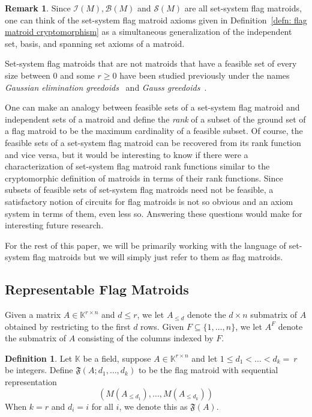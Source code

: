 \documentclass[12pt]{article}
\theoremstyle{definition}
\newtheorem{defn}[thm]{Definition}
\newtheorem{remark}[thm]{Remark}
\begin{document}
\begin{remark}\label{remark: flag matroid axioms genearlize matroid axioms}
    Since $\mathcal{I}(M), \mathcal{B}(M)$ and $\mathcal{S}(M)$ are all set-system flag matroids,
    one can think of the set-system flag matroid axioms given in Definition~\ref{defn: flag matroid cryptomorphism} as a simultaneous generalization of the independent set, basis, and spanning set axioms of a matroid.    
\end{remark}


Set-system flag matroids that are not matroids that have a feasible set of every size between $0$ and some $r \ge 0$ have been studied
previously under the names \emph{Gaussian elimination greedoids}~\cite{grinberga2020bhargava,grinberg2021greedoid} and \emph{Gauss greedoids}~\cite{greedoids}.

One can make an analogy between feasible sets of a set-system flag matroid and independent sets of a matroid and define the \emph{rank} of a subset of the ground set of a flag matroid to be the maximum cardinality of a feasible subset.
Of course, the feasible sets of a set-system flag matroid can be recovered from its rank function and vice versa,
but it would be interesting to know if there were a characterization of set-system flag matroid rank functions similar to the cryptomorphic definition of matroids in terms of their rank functions.
Since subsets of feasible sets of set-system flag matroids need not be feasible,
a satisfactory notion of circuits for flag matroids is not so obvious
and an axiom system in terms of them, even less so.
Answering these questions would make for interesting future research.

For the rest of this paper, we will be primarily working with the language of set-system flag matroids but we will simply just refer to them as flag matroids.

\subsection{Representable Flag Matroids}

Given a matrix $A \in \mathbb{K}^{r\times n}$
and $d \le r$, we let $A_{\le d}$ denote the $d\times n$ submatrix of $A$ obtained by restricting to the first $d$ rows.
Given $F \subseteq \{1,\dots,n\}$, we let $A^F$ denote the submatrix of $A$ consisting of the columns indexed by $F$.

\begin{defn}\label{defn: flag matroid from matrix}
    Let $\mathbb{K}$ be a field, suppose $A \in \mathbb{K}^{r\times n}$ and let $1 \le d_1 < \dots < d_k =~r$ be integers.
    Define $\mathfrak{F}(A; d_1, \dots, d_k)$ to be the flag matroid with sequential representation
    \[
        (M(A_{\le d_1}),\dots,M(A_{\le d_k}))
    \]
    When $k=r$ and $d_i = i$ for all $i$, we denote this as $\mathfrak{F}(A)$.
\end{defn}
\end{document}
